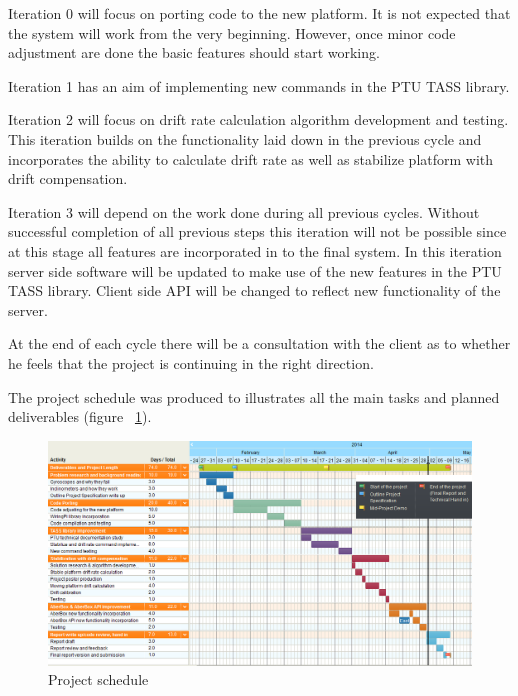 Iteration 0 will focus on porting code to the new platform. It is not expected that the system will work from the very beginning. However, once minor code adjustment are done the basic features should start working.

Iteration 1 has an aim of implementing new commands in the PTU TASS library.

Iteration 2 will focus on drift rate calculation algorithm development and testing. This iteration builds on the functionality laid down in the previous cycle and incorporates the ability to calculate drift rate as well as stabilize platform with drift compensation. 

Iteration 3 will depend on the work done during all previous cycles. Without successful completion of all previous steps this iteration will not be possible since at this stage all features are incorporated in to the final system. In this iteration server side software will be updated to make use of the new features in the PTU TASS library. Client side API will be changed to reflect new functionality of the server.

At the end of each cycle there will be a consultation with the client as to whether he feels that the project is continuing in the right direction.

The project schedule was produced to illustrates all the main tasks and planned deliverables (figure ~\ref{fig:ProjectSchedule}).

\begin{landscape}
\begin{figure}[H] 
\centering
\centerline{\includegraphics[scale=0.8]{./images/ProjectSchedule}}
\caption{Project schedule}
\label{fig:ProjectSchedule}
\end{figure}
\end{landscape}
